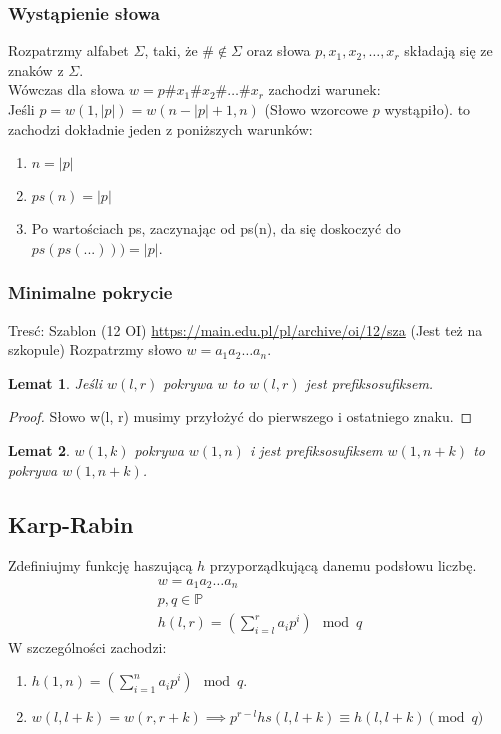 \documentclass{article}
\theoremstyle{break}
\newtheorem{lemma}{Lemat}
\newtheorem{proof}{Dowód}
\begin{document}
\subsubsection{Wystąpienie słowa}
Rozpatrzmy alfabet $\Sigma$, taki, że $ \# \not\in \Sigma$ oraz słowa $p, x_1, x_2, \dots, x_r$ składają się ze znaków z $\Sigma$. \\
Wówczas dla słowa $w=p\#x_1\#x_2\#\dots\#x_r$ zachodzi warunek: \\
Jeśli $p = w(1,|p|) = w(n-|p| + 1, n)$ (Słowo wzorcowe $p$ wystąpiło). to zachodzi dokładnie jeden z poniższych warunków: \\
\begin{enumerate}
\item $n = |p|$
\item $ps(n) = |p|$
\item Po wartościach ps, zaczynając od ps(n), da się doskoczyć do $ps(ps(...))) = |p|$. 
\end{enumerate}


\subsubsection{Minimalne pokrycie}
Tresć: Szablon (12 OI) \url{https://main.edu.pl/pl/archive/oi/12/sza} (Jest też na szkopule)
Rozpatrzmy słowo $w=a_1a_2\dots a_n$.
\begin{lemma}Jeśli $w(l, r)$ pokrywa $w$ to $w(l, r)$ jest prefiksosufiksem.
\end{lemma}
\begin{proof}
Słowo w(l, r) musimy przyłożyć do pierwszego i ostatniego znaku.
\end{proof}
\begin{lemma}$w(1, k)$ pokrywa $w(1, n)$ i jest prefiksosufiksem $w(1, n + k)$ to pokrywa $w(1, n+k)$.
\end{lemma}

\subsection{Karp-Rabin}
Zdefiniujmy funkcję haszującą $h$ przyporządkującą danemu podsłowu liczbę.
\begin{gather*}
	w = a_1a_2\dots a_n \\
	p, q \in \mathbb{P} \\
	h(l, r) =  (\sum_{i=l}^r a_ip^i) \mod{q}
\end{gather*}
W szczególności zachodzi:
\begin{enumerate}
\item $h(1, n) = (\sum_{i=1}^n a_ip^i) \mod{q}$.
\item $w(l, l+k) = w(r, r+k) \implies p^{r-l} hs(l, l+k) \equiv h(l, l+k) \pmod{q}$
\end{enumerate}
\end{document}
